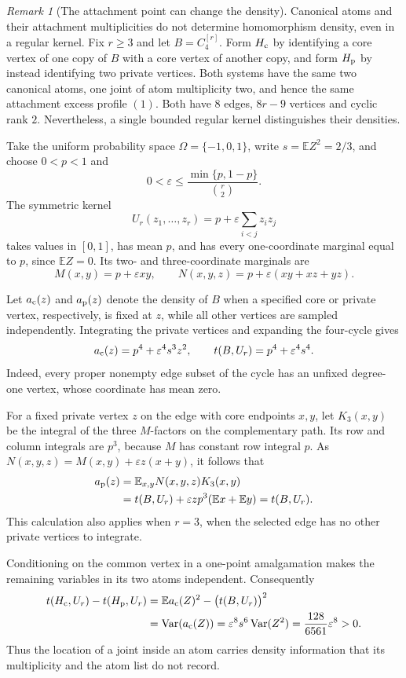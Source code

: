 \documentclass[a4paper,11pt,reqno]{amsart}
\theoremstyle{plain}
\theoremstyle{definition}
\theoremstyle{remark}
\newtheorem{remark}[theorem]{Remark}
\begin{document}
\begin{remark}[The attachment point can change the density]
\label{flesh-assembly-root-example}
Canonical atoms and their attachment multiplicities do not determine
homomorphism density, even in a regular kernel.  Fix $r\ge3$ and
let $B=C_4^{[r]}$.  Form $H_{\rm c}$ by identifying a core vertex
of one copy of $B$ with a core vertex of another copy, and form
$H_{\rm p}$ by instead identifying two private vertices.
Both systems have the same two canonical atoms, one joint of atom
multiplicity two, and hence the same attachment excess profile
$(1)$.  Both have $8$ edges, $8r-9$ vertices and cyclic rank $2$.
Nevertheless, a single bounded regular kernel distinguishes their
densities.

Take the uniform probability space $\Omega=\{-1,0,1\}$, write
$s=\mathbb E Z^2=2/3$, and choose $0<p<1$ and
\[
 0<\varepsilon\le
       \frac{\min\{p,1-p\}}{\binom r2}.
\]
The symmetric kernel
\[
 U_r(z_1,\ldots,z_r)
      =p+\varepsilon\sum_{i<j}z_i z_j
\]
takes values in $[0,1]$, has mean $p$, and has every
one-coordinate marginal equal to $p$, since $\mathbb E Z=0$.
Its two- and three-coordinate marginals are
\[
 M(x,y)=p+\varepsilon xy,
 \qquad N(x,y,z)=p+\varepsilon(xy+xz+yz).
\]

Let $a_{\rm c}(z)$ and $a_{\rm p}(z)$ denote the density of $B$
when a specified core or private vertex, respectively, is fixed
at $z$, while all other vertices are sampled independently.
Integrating the private vertices and expanding the four-cycle gives
\[
 a_{\rm c}(z)=p^4+\varepsilon^4s^3z^2,
 \qquad t(B,U_r)=p^4+\varepsilon^4s^4.
\]
Indeed, every proper nonempty edge subset of the cycle has an
unfixed degree-one vertex, whose coordinate has mean zero.

For a fixed private vertex $z$ on the edge with core endpoints
$x,y$, let $K_3(x,y)$ be the integral of the three $M$-factors
on the complementary path.  Its row and column integrals are
$p^3$, because $M$ has constant row integral $p$.
As $N(x,y,z)=M(x,y)+\varepsilon z(x+y)$, it follows that
\[
 \begin{split}
 a_{\rm p}(z)
 &=\mathbb E_{x,y}N(x,y,z)K_3(x,y)\\
 &=t(B,U_r)+\varepsilon z p^3
                      (\mathbb E x+\mathbb E y)
 =t(B,U_r).
 \end{split}
\]
This calculation also applies when $r=3$, when the selected edge
has no other private vertices to integrate.

Conditioning on the common vertex in a one-point amalgamation
makes the remaining variables in its two atoms independent.
Consequently
\[
 \begin{split}
 t(H_{\rm c},U_r)-t(H_{\rm p},U_r)
 &=\mathbb E a_{\rm c}(Z)^2-
                          \bigl(t(B,U_r)\bigr)^2\\
 &=\operatorname{Var}(a_{\rm c}(Z))
 =\varepsilon^8s^6\operatorname{Var}(Z^2)
 =\frac{128}{6561}\varepsilon^8>0.
 \end{split}
\]
Thus the location of a joint inside an atom carries density
information that its multiplicity and the atom list do not record.
\end{remark}
\end{document}
